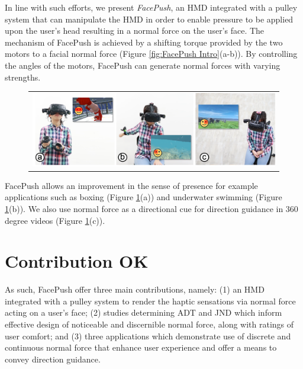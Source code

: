 In line with such efforts, we present \textit{FacePush}, an HMD integrated with a pulley system that can manipulate the HMD in order to enable pressure to be applied upon the user's head resulting in a normal force on the user's face. The mechanism of FacePush is achieved by a shifting torque provided by the two motors to a facial normal force (Figure \ref{fig:FacePush Intro}(a-b)). By controlling the angles of the motors, FacePush can generate normal forces with varying strengths. 

\begin{figure}[hp]
    \begin{center}
        \begin{tabular}{@{\hspace{0.1cm}}c}
           \includegraphics[width=1\textwidth]{figures/3Applications.png}
        \end{tabular}
        \label{fig:3Applicaions Intro}
    \end{center}
\end{figure}

FacePush allows an improvement in the sense of presence for example applications such as boxing (Figure \ref{fig:3Applicaions Intro}(a)) and underwater swimming (Figure \ref{fig:3Applicaions Intro}(b)). We also use normal force as a directional cue for direction guidance in 360 degree videos (Figure  \ref{fig:3Applicaions Intro}(c)).



\section{Contribution OK}

As such, FacePush offer three main contributions, namely: (1) an HMD integrated with a pulley system to render the haptic sensations via normal force acting on a user's face; (2) studies determining ADT and JND which inform effective design of noticeable and discernible normal force, along with ratings of user comfort; and (3) three applications which demonstrate use of discrete and continuous normal force that enhance user experience and offer a means to convey direction guidance.